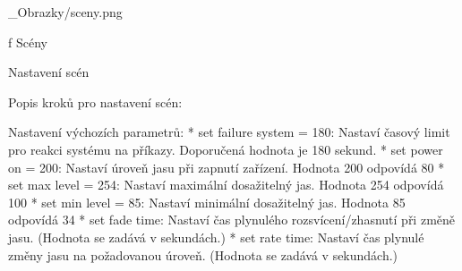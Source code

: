 








\medskip {}
\picw=16cm _Obrazky/sceny.png
\caption/f Scény
\medskip



\sec Nastavení scén

Popis kroků pro nastavení scén:

\medskip\noindent
{\sbf Nastavení výchozích parametrů:}
\begitems
    * {\sbf set failure system = 180:} Nastaví časový limit pro reakci systému na příkazy. Doporučená hodnota je 180 sekund.
    * {\sbf set power on = 200:} Nastaví úroveň jasu při zapnutí zařízení. Hodnota 200 odpovídá 80%
    * {\sbf set max level = 254:} Nastaví maximální dosažitelný jas. Hodnota 254 odpovídá 100%
    * {\sbf set min level = 85:} Nastaví minimální dosažitelný jas. Hodnota 85 odpovídá 34%
    * {\sbf set fade time:} Nastaví čas plynulého rozsvícení/zhasnutí při změně jasu. (Hodnota se zadává v sekundách.)
    * {\sbf set rate time:} Nastaví čas plynulé změny jasu na požadovanou úroveň. (Hodnota se zadává v sekundách.)
\enditems

